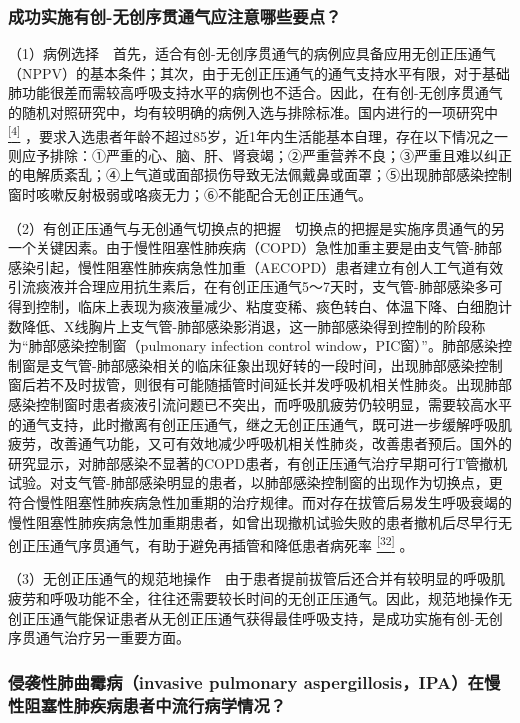 \subsubsection{成功实施有创-无创序贯通气应注意哪些要点？}

（1）病例选择　首先，适合有创-无创序贯通气的病例应具备应用无创正压通气（NPPV）的基本条件；其次，由于无创正压通气的通气支持水平有限，对于基础肺功能很差而需较高呼吸支持水平的病例也不适合。因此，在有创-无创序贯通气的随机对照研究中，均有较明确的病例入选与排除标准。国内进行的一项研究中
\protect\hyperlink{text00012.htmlux5cux23ch4-11}{\textsuperscript{{[}4{]}}}
，要求入选患者年龄不超过85岁，近1年内生活能基本自理，存在以下情况之一则应予排除：①严重的心、脑、肝、肾衰竭；②严重营养不良；③严重且难以纠正的电解质紊乱；④上气道或面部损伤导致无法佩戴鼻或面罩；⑤出现肺部感染控制窗时咳嗽反射极弱或咯痰无力；⑥不能配合无创正压通气。

（2）有创正压通气与无创通气切换点的把握　切换点的把握是实施序贯通气的另一个关键因素。由于慢性阻塞性肺疾病（COPD）急性加重主要是由支气管-肺部感染引起，慢性阻塞性肺疾病急性加重（AECOPD）患者建立有创人工气道有效引流痰液并合理应用抗生素后，在有创正压通气5～7天时，支气管-肺部感染多可得到控制，临床上表现为痰液量减少、粘度变稀、痰色转白、体温下降、白细胞计数降低、X线胸片上支气管-肺部感染影消退，这一肺部感染得到控制的阶段称为“肺部感染控制窗（pulmonary
infection control
window，PIC窗）”。肺部感染控制窗是支气管-肺部感染相关的临床征象出现好转的一段时间，出现肺部感染控制窗后若不及时拔管，则很有可能随插管时间延长并发呼吸机相关性肺炎。出现肺部感染控制窗时患者痰液引流问题已不突出，而呼吸肌疲劳仍较明显，需要较高水平的通气支持，此时撤离有创正压通气，继之无创正压通气，既可进一步缓解呼吸肌疲劳，改善通气功能，又可有效地减少呼吸机相关性肺炎，改善患者预后。国外的研究显示，对肺部感染不显著的COPD患者，有创正压通气治疗早期可行T管撤机试验。对支气管-肺部感染明显的患者，以肺部感染控制窗的出现作为切换点，更符合慢性阻塞性肺疾病急性加重期的治疗规律。而对存在拔管后易发生呼吸衰竭的慢性阻塞性肺疾病急性加重期患者，如曾出现撤机试验失败的患者撤机后尽早行无创正压通气序贯通气，有助于避免再插管和降低患者病死率
\protect\hyperlink{text00012.htmlux5cux23ch32-11}{\textsuperscript{{[}32{]}}}
。

（3）无创正压通气的规范地操作　由于患者提前拔管后还合并有较明显的呼吸肌疲劳和呼吸功能不全，往往还需要较长时间的无创正压通气。因此，规范地操作无创正压通气能保证患者从无创正压通气获得最佳呼吸支持，是成功实施有创-无创序贯通气治疗另一重要方面。

\subsubsection{侵袭性肺曲霉病（invasive pulmonary aspergillosis，IPA）在慢性阻塞性肺疾病患者中流行病学情况？}


